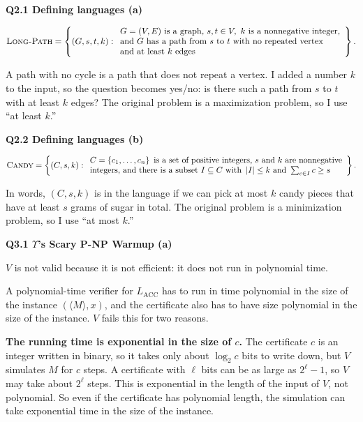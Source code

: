 \documentclass[11pt]{article}
\newcommand{\set}[1]{\left\{#1\right\}}
\newcommand{\abs}[1]{\left|#1\right|}
\newcommand{\inner}[1]{\langle #1 \rangle}
\newcommand{\cproblem}[1]{\textsc{#1}}
\newcommand{\Lacc}{L_{\text{ACC}}}
\newcommand{\LP}{\cproblem{Long-Path}}
\newcommand{\Candy}{\cproblem{Candy}}
\newcommand{\qpage}[1]{\clearpage\noindent\textbf{\large #1}\par\medskip}
\begin{document}
\qpage{Q2.1 Defining languages (a)}

\[
  \LP = \set{(G, s, t, k) :
  \begin{array}{l}
    G = (V, E) \text{ is a graph, } s, t \in V, \ k \text{ is a nonnegative integer,}\\
    \text{and } G \text{ has a path from } s \text{ to } t \text{ with no repeated vertex}\\
    \text{and at least } k \text{ edges}
  \end{array}}.
\]

A path with no cycle is a path that does not repeat a vertex.
I added a number $k$ to the input, so the question becomes yes/no: is there such a path from $s$ to $t$ with at least $k$ edges?
The original problem is a maximization problem, so I use ``at least $k$.''

\qpage{Q2.2 Defining languages (b)}

\[
  \Candy = \set{(C, s, k) :
  \begin{array}{l}
    C = \set{c_1, \ldots, c_n} \text{ is a set of positive integers, } s \text{ and } k \text{ are nonnegative}\\
    \text{integers, and there is a subset } I \subseteq C \text{ with } \abs{I} \leq k \text{ and } \sum_{c \in I} c \geq s
  \end{array}}.
\]

In words, $(C, s, k)$ is in the language if we can pick at most $k$ candy pieces that have at least $s$ grams of sugar in total.
The original problem is a minimization problem, so I use ``at most $k$.''

\qpage{Q3.1 $\Upsilon$'s Scary P-NP Warmup (a)}

$V$ is not valid because it is not efficient: it does not run in polynomial time.

A polynomial-time verifier for $\Lacc$ has to run in time polynomial in the size of the instance $(\inner{M}, x)$, and the certificate also has to have size polynomial in the size of the instance.
$V$ fails this for two reasons.

\textbf{The running time is exponential in the size of $c$.}
The certificate $c$ is an integer written in binary, so it takes only about $\log_2 c$ bits to write down, but $V$ simulates $M$ for $c$ steps.
A certificate with $\ell$ bits can be as large as $2^\ell - 1$, so $V$ may take about $2^\ell$ steps. This is exponential in the length of the input of $V$, not polynomial.
So even if the certificate has polynomial length, the simulation can take exponential time in the size of the instance.
\end{document}
